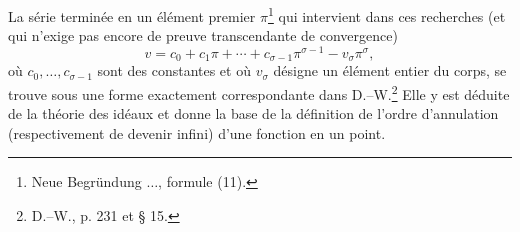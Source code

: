 La \og{}série terminée\fg{} en un élément premier \(\pi\)\footnote{Neue Begründung \(\ldots\), formule (11).} qui intervient dans ces recherches (et qui n'exige pas encore de preuve transcendante de convergence)
\[
v=c_0+c_1\pi+\cdots+c_{\sigma-1}\pi^{\sigma-1}-v_\sigma\pi^\sigma,
\]
où \(c_0,\ldots,c_{\sigma-1}\) sont des constantes et où \(v_\sigma\) désigne un élément entier du corps, se trouve sous une forme exactement correspondante dans D.--W.\footnote{D.--W., p. 231 et \S{} 15.} Elle y est déduite de la théorie des idéaux et donne la base de la définition de l'ordre d'annulation (respectivement de devenir infini) d'une fonction en un point.
